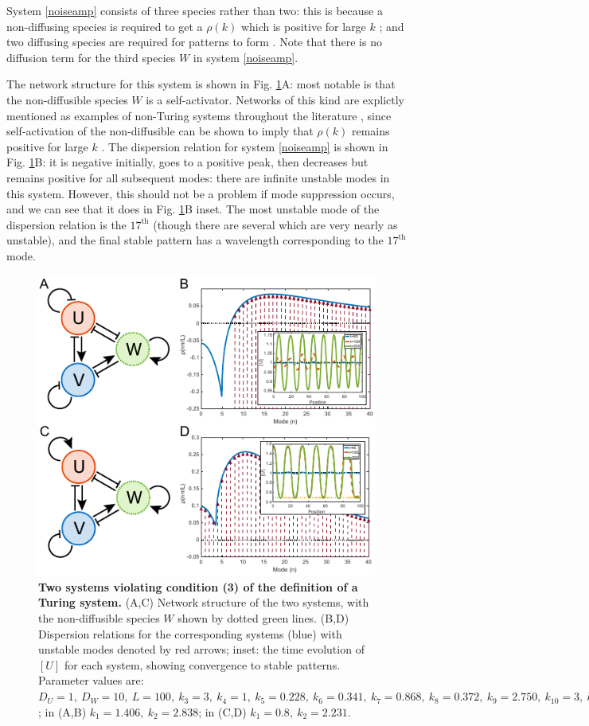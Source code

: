 System \eqref{noiseamp} consists of three species rather than two: this is because a non-diffusing species is required to get a $\rho(k)$ which is positive for large $k$ \cite{klika2012influence}; and two diffusing species are required for patterns to form \cite{murray2001mathematical}. Note that there is no diffusion term for the third species $W$ in system \eqref{noiseamp}. 

The network structure for this system is shown in Fig. \ref{fig3}A: most notable is that the non-diffusible species $W$ is a self-activator. Networks of this kind are explictly mentioned as examples of non-Turing systems throughout the literature \cite{klika2012influence,marcon2016high,smith2018model,diego2017key}, since self-activation of the non-diffusible can be shown to imply that $\rho(k)$ remains positive for large $k$ \cite{klika2012influence}. The dispersion relation for system \eqref{noiseamp} is shown in Fig. \ref{fig3}B: it is negative initially, goes to a positive peak, then decreases but remains positive for all subsequent modes: there are infinite unstable modes in this system. However, this should not be a problem if mode suppression occurs, and we can see that it does in Fig. \ref{fig3}B inset. The most unstable mode of the dispersion relation is the $17^\text{th}$ (though there are several which are very nearly as unstable), and the final stable pattern has a wavelength corresponding to the $17^\text{th}$ mode.

\begin{figure}[ht]
  \centering
  \includegraphics[width=0.6\linewidth]{disp7}
  \caption{\textbf{Two systems violating condition (3) of the definition of a Turing system.} (A,C) Network structure of the two systems, with the non-diffusible species $W$ shown by dotted green lines. (B,D) Dispersion relations for the corresponding systems (blue) with unstable modes denoted by red arrows; inset: the time evolution of $[U]$ for each system, showing convergence to stable patterns. Parameter values are: $D_U=1,~D_W=10,~L=100,~k_3=3,~k_4=1,~k_5=0.228,~k_6=0.341,~k_7=0.868,~k_8=0.372,~k_9=2.750,~k_{10}=3,~k_{11}=1.~k_{12}=0.489,~k_{13}=0.882,~k_{14}=0.111,~k_{15}=2.734,~k_{16}=0.258,~k_{17}=3,~k_{18}=1$; in (A,B) $k_1=1.406,~k_2=2.838$; in (C,D) $k_1=0.8,~k_2=2.231$.}
  \label{fig3}
\end{figure}

